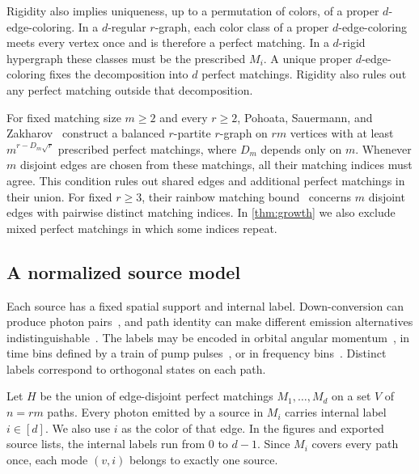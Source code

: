 \documentclass[10pt]{article}
\numberwithin{equation}{section}
\theoremstyle{definition}
\begin{document}
Rigidity also implies uniqueness, up to a permutation of colors, of a proper $d$-edge-coloring. In a $d$-regular $r$-graph, each color class of a proper $d$-edge-coloring meets every vertex once and is therefore a perfect matching. In a $d$-rigid hypergraph these classes must be the prescribed $M_i$. A unique proper $d$-edge-coloring fixes the decomposition into $d$ perfect matchings. Rigidity also rules out any perfect matching outside that decomposition.

For fixed matching size $m\ge2$ and every $r\ge2$, Pohoata, Sauermann, and Zakharov~\cite[Theorem~4.3 of the preprint]{PSZ2025} construct a balanced $r$-partite $r$-graph on $rm$ vertices with at least $m^{r-D_m\sqrt r}$ prescribed perfect matchings, where $D_m$ depends only on $m$. Whenever $m$ disjoint edges are chosen from these matchings, all their matching indices must agree. This condition rules out shared edges and additional perfect matchings in their union. For fixed $r\ge3$, their rainbow matching bound~\cite[Theorem~1.2]{PSZ2025} concerns $m$ disjoint edges with pairwise distinct matching indices. In \cref{thm:growth} we also exclude mixed perfect matchings in which some indices repeat.

\subsection{A normalized source model}
\label{sec:optical-model}

Each source has a fixed spatial support and internal label. Down-conversion can produce photon pairs~\cite{HongMandel1985}, and path identity can make different emission alternatives indistinguishable~\cite{KrennHochrainerLahiriZeilinger2017}. The labels may be encoded in orbital angular momentum~\cite{MairEtAl2001}, in time bins defined by a train of pump pulses~\cite{DeRiedmattenEtAl2002}, or in frequency bins~\cite{OlislagerEtAl2010,KuesEtAl2017}. Distinct labels correspond to orthogonal states on each path.

Let $H$ be the union of edge-disjoint perfect matchings $M_1,\ldots,M_d$ on a set $V$ of $n=rm$ paths. Every photon emitted by a source in $M_i$ carries internal label $i\in[d]$. We also use $i$ as the color of that edge. In the figures and exported source lists, the internal labels run from $0$ to $d-1$. Since $M_i$ covers every path once, each mode $(v,i)$ belongs to exactly one source.
\end{document}
